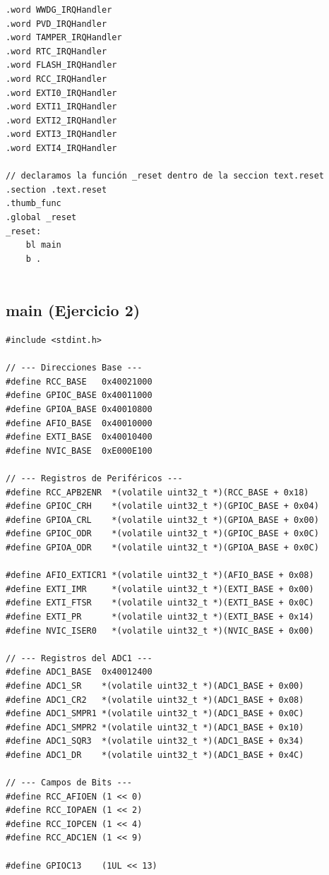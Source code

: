 \begin{lstlisting}[language=ARMasm]
.word WWDG_IRQHandler
.word PVD_IRQHandler
.word TAMPER_IRQHandler
.word RTC_IRQHandler
.word FLASH_IRQHandler
.word RCC_IRQHandler
.word EXTI0_IRQHandler
.word EXTI1_IRQHandler
.word EXTI2_IRQHandler
.word EXTI3_IRQHandler
.word EXTI4_IRQHandler

// declaramos la función _reset dentro de la seccion text.reset
.section .text.reset
.thumb_func
.global _reset
_reset:
    bl main
    b .
    

\end{lstlisting}
\subsection{main (Ejercicio 2)}

\begin{lstlisting}[language=Linker]
#include <stdint.h>

// --- Direcciones Base ---
#define RCC_BASE   0x40021000
#define GPIOC_BASE 0x40011000
#define GPIOA_BASE 0x40010800
#define AFIO_BASE  0x40010000
#define EXTI_BASE  0x40010400
#define NVIC_BASE  0xE000E100

// --- Registros de Periféricos ---
#define RCC_APB2ENR  *(volatile uint32_t *)(RCC_BASE + 0x18)
#define GPIOC_CRH    *(volatile uint32_t *)(GPIOC_BASE + 0x04)
#define GPIOA_CRL    *(volatile uint32_t *)(GPIOA_BASE + 0x00)
#define GPIOC_ODR    *(volatile uint32_t *)(GPIOC_BASE + 0x0C)
#define GPIOA_ODR    *(volatile uint32_t *)(GPIOA_BASE + 0x0C)

#define AFIO_EXTICR1 *(volatile uint32_t *)(AFIO_BASE + 0x08)
#define EXTI_IMR     *(volatile uint32_t *)(EXTI_BASE + 0x00)
#define EXTI_FTSR    *(volatile uint32_t *)(EXTI_BASE + 0x0C)
#define EXTI_PR      *(volatile uint32_t *)(EXTI_BASE + 0x14)
#define NVIC_ISER0   *(volatile uint32_t *)(NVIC_BASE + 0x00)

// --- Registros del ADC1 ---
#define ADC1_BASE  0x40012400
#define ADC1_SR    *(volatile uint32_t *)(ADC1_BASE + 0x00)
#define ADC1_CR2   *(volatile uint32_t *)(ADC1_BASE + 0x08)
#define ADC1_SMPR1 *(volatile uint32_t *)(ADC1_BASE + 0x0C)
#define ADC1_SMPR2 *(volatile uint32_t *)(ADC1_BASE + 0x10)
#define ADC1_SQR3  *(volatile uint32_t *)(ADC1_BASE + 0x34)
#define ADC1_DR    *(volatile uint32_t *)(ADC1_BASE + 0x4C)

// --- Campos de Bits ---
#define RCC_AFIOEN (1 << 0)
#define RCC_IOPAEN (1 << 2)
#define RCC_IOPCEN (1 << 4)
#define RCC_ADC1EN (1 << 9)

#define GPIOC13    (1UL << 13)



\end{lstlisting}
